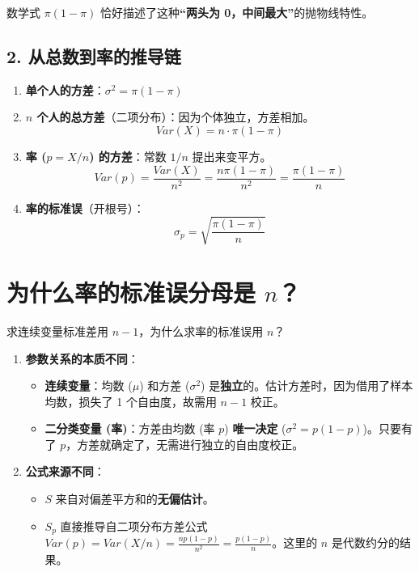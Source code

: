 \documentclass[lang=cn,10pt]{elegantbook}
\begin{document}
数学式 $\pi(1-\pi)$ 恰好描述了这种\textbf{“两头为 0，中间最大”}的抛物线特性。

\subsection{2. 从总数到率的推导链}
\begin{enumerate}
    \item \textbf{单个人的方差}：$\sigma^2 = \pi(1-\pi)$
    \item \textbf{$n$ 个人的总方差}（二项分布）：因为个体独立，方差相加。
    \[ Var(X) = n \cdot \pi(1-\pi) \]
    \item \textbf{率 ($p=X/n$) 的方差}：常数 $1/n$ 提出来变平方。
    \[ Var(p) = \frac{Var(X)}{n^2} = \frac{n\pi(1-\pi)}{n^2} = \frac{\pi(1-\pi)}{n} \]
    \item \textbf{率的标准误}（开根号）：
    \[ \sigma_p = \sqrt{\frac{\pi(1-\pi)}{n}} \]
\end{enumerate}

\section{为什么率的标准误分母是 $n$？}

求连续变量标准差用 $n-1$，为什么求率的标准误用 $n$？

\begin{enumerate}
    \item \textbf{参数关系的本质不同}：
    \begin{itemize}
        \item \textbf{连续变量}：均数 ($\mu$) 和方差 ($\sigma^2$) 是\textbf{独立}的。估计方差时，因为借用了样本均数，损失了 1 个自由度，故需用 $n-1$ 校正。
        \item \textbf{二分类变量 (率)}：方差由均数 (率 $p$) \textbf{唯一决定} ($\sigma^2 = p(1-p)$)。只要有了 $p$，方差就确定了，无需进行独立的自由度校正。
    \end{itemize}

    \item \textbf{公式来源不同}：
    \begin{itemize}
        \item $S$ 来自对偏差平方和的\textbf{无偏估计}。
        \item $S_p$ 直接推导自二项分布方差公式 $Var(p) = Var(X/n) = \frac{np(1-p)}{n^2} = \frac{p(1-p)}{n}$。这里的 $n$ 是代数约分的结果。
    \end{itemize}
\end{enumerate}
\end{document}
